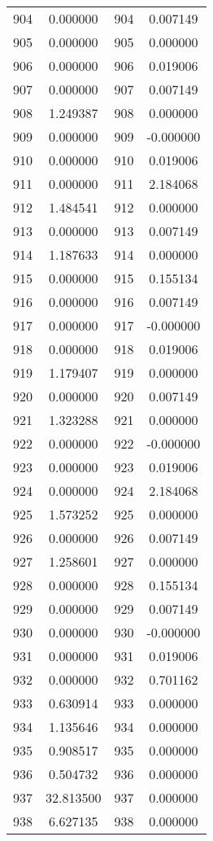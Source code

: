 \documentclass[12pt]{article}
\begin{document}
\begin{longtable}{@{}cccc@{}}
904 & 0.000000 & 904 & 0.007149 \\
905 & 0.000000 & 905 & 0.000000 \\
906 & 0.000000 & 906 & 0.019006 \\
907 & 0.000000 & 907 & 0.007149 \\
908 & 1.249387 & 908 & 0.000000 \\
909 & 0.000000 & 909 & -0.000000 \\
910 & 0.000000 & 910 & 0.019006 \\
911 & 0.000000 & 911 & 2.184068 \\
912 & 1.484541 & 912 & 0.000000 \\
913 & 0.000000 & 913 & 0.007149 \\
914 & 1.187633 & 914 & 0.000000 \\
915 & 0.000000 & 915 & 0.155134 \\
916 & 0.000000 & 916 & 0.007149 \\
917 & 0.000000 & 917 & -0.000000 \\
918 & 0.000000 & 918 & 0.019006 \\
919 & 1.179407 & 919 & 0.000000 \\
920 & 0.000000 & 920 & 0.007149 \\
921 & 1.323288 & 921 & 0.000000 \\
922 & 0.000000 & 922 & -0.000000 \\
923 & 0.000000 & 923 & 0.019006 \\
924 & 0.000000 & 924 & 2.184068 \\
925 & 1.573252 & 925 & 0.000000 \\
926 & 0.000000 & 926 & 0.007149 \\
927 & 1.258601 & 927 & 0.000000 \\
928 & 0.000000 & 928 & 0.155134 \\
929 & 0.000000 & 929 & 0.007149 \\
930 & 0.000000 & 930 & -0.000000 \\
931 & 0.000000 & 931 & 0.019006 \\
932 & 0.000000 & 932 & 0.701162 \\
933 & 0.630914 & 933 & 0.000000 \\
934 & 1.135646 & 934 & 0.000000 \\
935 & 0.908517 & 935 & 0.000000 \\
936 & 0.504732 & 936 & 0.000000 \\
937 & 32.813500 & 937 & 0.000000 \\
938 & 6.627135 & 938 & 0.000000 \\

\end{longtable}
\end{document}
